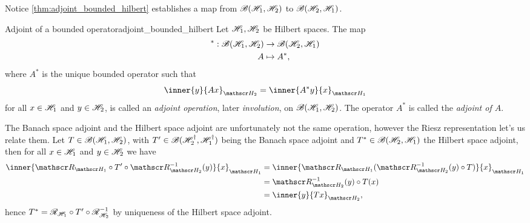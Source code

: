 Notice \cref{thm:adjoint_bounded_hilbert} establishes a map from \(\mathscr{B}(\mathscr{H}_1, \mathscr{H}_2)\) to \(\mathscr{B}(\mathscr{H}_2, \mathscr{H}_1)\).
\begin{definition}{Adjoint of a bounded operator}{adjoint_bounded_hilbert}
    Let \(\mathscr{H}_1, \mathscr{H}_2\) be Hilbert spaces. The map
    \begin{align*}
        ^* : \mathscr{B}(\mathscr{H}_1, \mathscr{H}_2) &\to \mathscr{B}(\mathscr{H}_2, \mathscr{H}_1)\\
                                           A &\mapsto A^*,
    \end{align*}
    where \(A^*\) is the unique bounded operator such that
    \begin{equation*}
        \inner{y}{Ax}_{\hilbert_2} = \inner{A^*y}{x}_{\hilbert_1}
    \end{equation*}
    for all \(x \in \mathscr{H}_1\) and \(y \in \mathscr{H}_2\), is called an \emph{adjoint operation}, later \emph{involution}, on \(\mathscr{B}(\mathscr{H}_1, \mathscr{H}_2)\). The operator \(A^*\) is called the \emph{adjoint of \(A\)}.
\end{definition}
\begin{remark}
    The Banach space adjoint and the Hilbert space adjoint are unfortunately not the same operation, however the Riesz representation let's us relate them. Let \(T \in \mathscr{B}(\mathscr{H}_1, \mathscr{H}_2)\), with \(T' \in \mathscr{B}(\mathscr{H}_2^\dag, \mathscr{H}_1^\dag)\) being the Banach space adjoint and \(T^* \in \mathscr{B}(\mathscr{H}_2, \mathscr{H}_1)\) the Hilbert space adjoint, then for all \(x \in \mathscr{H}_1\) and \(y \in \mathscr{H}_2\) we have
    \begin{align*}
        \inner{\riesz_{\hilbert_1} \circ T' \circ \riesz_{\hilbert_2}^{-1}(y)}{x}_{\hilbert_1}
        &= \inner{\riesz_{\hilbert_1}(\riesz_{\hilbert_2}^{-1}(y) \circ T)}{x}_{\hilbert_1}\\
        &= \riesz_{\hilbert_2}^{-1}(y) \circ T(x)\\
        &= \inner{y}{Tx}_{\hilbert_2},
    \end{align*}
    hence \(T^* = \mathscr{R}_{\mathscr{H}_1} \circ T' \circ \mathscr{R}^{-1}_{\mathscr{H}_2}\) by uniqueness of the Hilbert space adjoint.
\end{remark}

